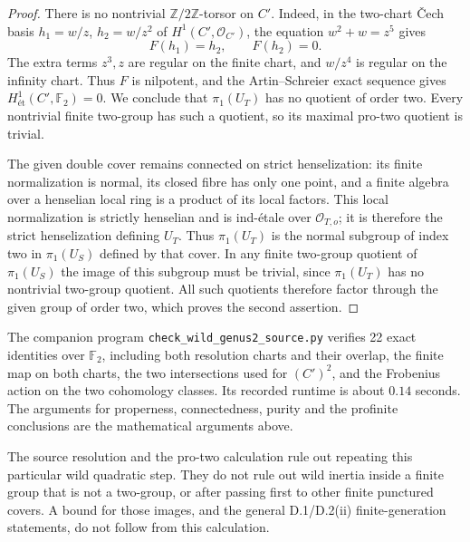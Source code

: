 \begin{proof}
There is no nontrivial \(\mathbb Z/2\mathbb Z\)-torsor on
$C'$.  Indeed, in the two-chart \v Cech basis
$h_1=w/z$, $h_2=w/z^2$ of $H^1(C',\mathcal O_{C'})$,
the equation $w^2+w=z^5$ gives
\[
                              F(h_1)=h_2,\qquad F(h_2)=0.
\]
The extra terms $z^3,z$ are regular on the finite chart,
and $w/z^4$ is regular on the infinity chart.  Thus $F$
is nilpotent, and the Artin--Schreier exact sequence gives
$H^1_{\text{ét}}(C',\mathbb F_2)=0$.  We conclude
that $\pi_1(U_T)$ has no quotient of order two.  Every
nontrivial finite two-group has such a quotient, so its
maximal pro-two quotient is trivial.

The given double cover remains connected on strict
henselization: its finite normalization is normal, its
closed fibre has only one point, and a finite algebra over
a henselian local ring is a product of its local factors.
This local normalization is strictly henselian and is
ind-\'etale over $\mathcal O_{T,o}$; it is therefore
the strict henselization defining $U_T$.
Thus $\pi_1(U_T)$ is the normal subgroup of index two in
$\pi_1(U_S)$ defined by that cover.  In any finite
two-group quotient of $\pi_1(U_S)$ the image of this
subgroup must be trivial, since $\pi_1(U_T)$ has no
nontrivial two-group quotient.  All such quotients
therefore factor through the given group of order two,
which proves the second assertion.
\end{proof}

\begin{remark}
The companion program
\texttt{check\_wild\_genus2\_source.py} verifies 22 exact
identities over $\mathbb F_2$, including both resolution
charts and their overlap, the finite map on both charts,
the two intersections used for $(C')^2$, and the
Frobenius action on the two cohomology classes.  Its
recorded runtime is about $0.14$ seconds.  The arguments
for properness, connectedness, purity and the profinite
conclusions are the mathematical arguments above.
\end{remark}

\begin{remark}
The source resolution and the pro-two calculation rule out
repeating this particular wild quadratic step.  They do
not rule out wild inertia inside a finite group that is
not a two-group, or after passing first to other finite
punctured covers.  A bound for those images, and the
general D.1/D.2(ii) finite-generation statements, do not
follow from this calculation.
\end{remark}
